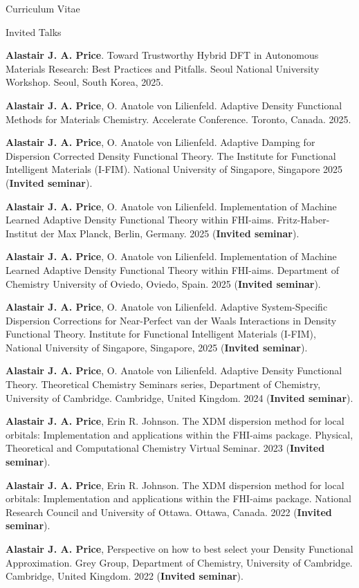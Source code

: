 \documentclass[a4paper,oneside,11pt]{article}
\begin{document}
\begin{cv}{Curriculum Vitae}
\setlength{\cvlabelwidth}{0.5cm}  \begin{cvlist}{Invited Talks}
\item[10.] \textbf{Alastair J. A. Price}. Toward Trustworthy Hybrid DFT in Autonomous Materials Research: Best Practices and Pitfalls. Seoul National University Workshop. Seoul, South Korea, 2025.
\item[9.] \textbf{Alastair J. A. Price}, O. Anatole von Lilienfeld. Adaptive Density Functional Methods for Materials Chemistry. Accelerate Conference. Toronto, Canada. 2025.
\item[8.] \textbf{Alastair J. A. Price}, O. Anatole von Lilienfeld. Adaptive Damping for Dispersion Corrected Density Functional Theory. The Institute for Functional Intelligent Materials (I-FIM). National University of Singapore, Singapore 2025 ({\bf Invited seminar}). 
\item[7.] \textbf{Alastair J. A. Price}, O. Anatole von Lilienfeld. Implementation of Machine Learned Adaptive Density Functional Theory within FHI-aims. Fritz-Haber-Institut der Max Planck, Berlin, Germany. 2025 ({\bf Invited seminar}).
\item[6.] \textbf{Alastair J. A. Price}, O. Anatole von Lilienfeld. Implementation of Machine Learned Adaptive Density Functional Theory within FHI-aims. Department of Chemistry University of Oviedo, Oviedo, Spain. 2025 ({\bf Invited seminar}).
\item[5.] \textbf{Alastair J. A. Price}, O. Anatole von Lilienfeld. Adaptive System-Specific Dispersion Corrections for Near-Perfect van der Waals Interactions in Density Functional Theory. Institute for Functional Intelligent Materials (I-FIM), National University of Singapore, Singapore, 2025 ({\bf Invited seminar}). 
\item[4.] \textbf{Alastair J. A. Price}, O. Anatole von Lilienfeld. Adaptive Density Functional Theory. Theoretical Chemistry Seminars series, Department of Chemistry, University of Cambridge. Cambridge, United Kingdom. 2024 ({\bf Invited seminar}).
\item[3.] \textbf{Alastair J. A. Price}, Erin R. Johnson. The XDM dispersion method for local orbitals: Implementation and applications within the FHI-aims package. Physical, Theoretical and Computational Chemistry Virtual Seminar. 2023 ({\bf Invited seminar}).
\item[2.] \textbf{Alastair J. A. Price}, Erin R. Johnson. The XDM dispersion method for local orbitals: Implementation and applications within the FHI-aims package. National Research Council and University of Ottawa. Ottawa, Canada. 2022 ({\bf Invited seminar}).
\item[1.] \textbf{Alastair J. A. Price}, Perspective on how to best select your Density Functional Approximation. Grey Group, Department of Chemistry, University of Cambridge. Cambridge, United Kingdom. 2022 ({\bf Invited seminar}).
\end{cvlist}


\end{cv}
\end{document}
